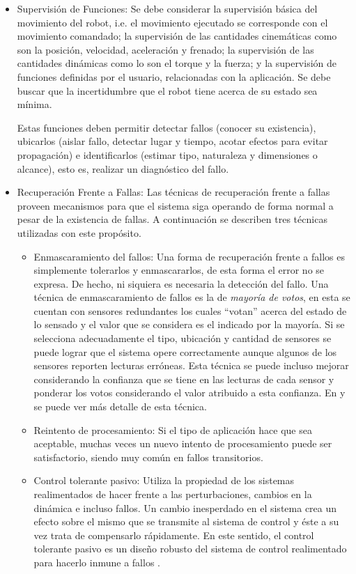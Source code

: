\documentclass[withindex,glossary]{cam-thesis}
\begin{document}
\begin{itemize}
\item Supervisión de Funciones: 
Se debe considerar la supervisión básica del movimiento del robot, i.e. el movimiento ejecutado se corresponde con el movimiento comandado; la supervisión de las cantidades cinemáticas como son la posición, velocidad, aceleración y frenado; la supervisión de las cantidades dinámicas como lo son el torque y la fuerza; y la supervisión de funciones definidas por el usuario, relacionadas con la aplicación. Se debe buscar que la incertidumbre que el robot tiene acerca de su estado sea mínima.

Estas funciones deben permitir detectar fallos (conocer su existencia), ubicarlos (aislar fallo, detectar lugar y tiempo, acotar efectos para evitar propagación) e identificarlos (estimar tipo, naturaleza y dimensiones o alcance), esto es, realizar un diagnóstico del fallo.
\item Recuperación Frente a Fallas: 
Las técnicas de recuperación frente a fallas proveen mecanismos para que el sistema siga operando de forma normal a pesar de la existencia de fallas. A continuación se describen tres técnicas utilizadas con este propósito.
	\begin{itemize}
		\item Enmascaramiento del fallos: Una forma de recuperación frente a fallos es simplemente tolerarlos y enmascararlos, de esta forma el error no se expresa. De hecho, ni siquiera es necesaria la detección del fallo. Una técnica de enmascaramiento de fallos es la de \textit{mayoría de votos}, en esta se cuentan con sensores redundantes los cuales ``votan'' acerca del estado de lo sensado y el valor que se considera es el indicado por la mayoría. Si se selecciona adecuadamente el tipo, ubicación y cantidad de sensores se puede lograr que el sistema opere correctamente aunque algunos de los sensores reporten lecturas erróneas. Esta técnica se puede incluso mejorar considerando la confianza que se tiene en las lecturas de cada sensor y ponderar los votos considerando el valor atribuido a esta confianza. En \cite{GARCIA200711} y \cite{ROGINA1999} se puede ver más detalle de esta técnica.
		\item Reintento de procesamiento: Si el tipo de aplicación hace que sea aceptable, muchas veces un nuevo intento de procesamiento puede ser satisfactorio, siendo muy común en fallos transitorios.
		\item Control tolerante pasivo: Utiliza la propiedad de los sistemas realimentados de hacer frente a las perturbaciones, cambios en la dinámica e incluso fallos. Un cambio inesperdado en el sistema crea un efecto sobre el mismo que se transmite al sistema de control y éste a su vez trata de compensarlo rápidamente. En este sentido, el control tolerante pasivo es un diseño robusto del sistema de control realimentado para hacerlo inmune a fallos \cite{PATTON19971029}.

\end{itemize}
\end{itemize}
\end{document}
